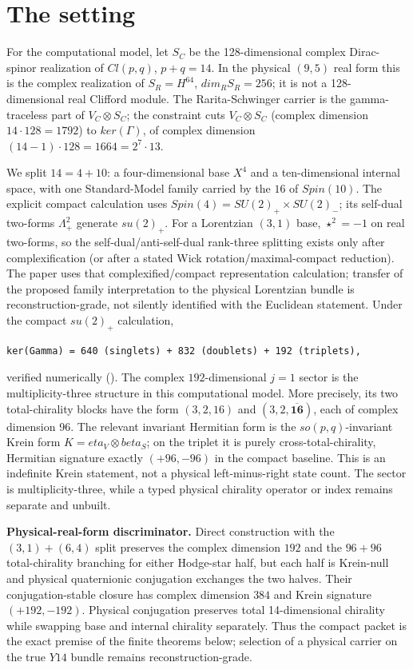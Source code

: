\documentclass[11pt]{article}
\theoremstyle{remark}
\begin{document}
\section{The setting}
For the computational model, let $S_C$ be the 128-dimensional complex Dirac-spinor realization of $Cl(p,q)$, $p+q = 14$. In the physical $(9,5)$ real form this is the complex realization of $S_R = H^64$, $dim_R S_R = 256$; it is not a 128-dimensional real Clifford module. The Rarita-Schwinger carrier is the gamma-traceless part of $V_C \otimes S_C$; the constraint cuts $V_C \otimes S_C$ (complex dimension $14\cdot 128 = 1792$) to $ker(\Gamma)$, of complex dimension $(14-1)\cdot 128 = 1664 = 2^7 \cdot  13$.

We split $14 = 4 + 10$: a four-dimensional base $X^4$ and a ten-dimensional internal space, with one Standard-Model family carried by the $16$ of $Spin(10)$. The explicit compact calculation uses $Spin(4) = SU(2)_+ \times SU(2)_-$; its self-dual two-forms $\Lambda^2_+$ generate $su(2)_+$. For a Lorentzian $(3,1)$ base, $\star^2=-1$ on real two-forms, so the self-dual/anti-self-dual rank-three splitting exists only after complexification (or after a stated Wick rotation/maximal-compact reduction). The paper uses that complexified/compact representation calculation; transfer of the proposed family interpretation to the physical Lorentzian bundle is reconstruction-grade, not silently identified with the Euclidean statement. Under the compact $su(2)_+$ calculation,

\begin{lstlisting}
ker(Gamma) = 640 (singlets) + 832 (doublets) + 192 (triplets),
\end{lstlisting}
verified numerically (). The complex $192$-dimensional $j=1$ sector is the multiplicity-three structure in this computational model. More precisely, its two total-chirality blocks have the form $(3,2,16)$ and $(3,2,\overline{\mathbf{16}})$, each of complex dimension 96. The relevant invariant Hermitian form is the $so(p,q)$-invariant Krein form $K = eta_V \otimes beta_S$; on the triplet it is purely cross-total-chirality, Hermitian signature exactly $(+96, -96)$ in the compact baseline. This is an indefinite Krein statement, not a physical left-minus-right state count. The sector is multiplicity-three, while a typed physical chirality operator or index remains separate and unbuilt.

\textbf{Physical-real-form discriminator.} Direct construction with the $(3,1)+(6,4)$ split preserves the complex dimension $192$ and the $96+96$ total-chirality branching for either Hodge-star half, but each half is Krein-null and physical quaternionic conjugation exchanges the two halves. Their conjugation-stable closure has complex dimension $384$ and Krein signature $(+192,-192)$. Physical conjugation preserves total 14-dimensional chirality while swapping base and internal chirality separately. Thus the compact packet is the exact premise of the finite theorems below; selection of a physical carrier on the true $Y14$ bundle remains reconstruction-grade.
\end{document}
